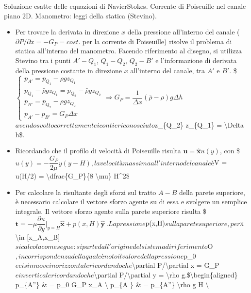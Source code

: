\documentclass[letterpaper,10pt,italian]{jupyterBook}
\begin{document}
\sphinxAtStartPar
Soluzione esatte delle equazioni di Navier\sphinxhyphen{}Stokes. Corrente di
Poiseuille nel canale piano 2D. Manometro: leggi della statica
(Stevino).
\begin{itemize}
\item {} 
\sphinxAtStartPar
Per trovare la derivata in direzione \(x\) della pressione all’interno
del canale (\(\partial P/\partial x = - G_P = cost.\) per la corrente
di Poiseuille) risolve il problema di statica all’interno del
manometro. Facendo riferimento al disegno, si utilizza Stevino tra i
punti \(A'-Q_1\), \(Q_1-Q_2\), \(Q_2-B'\) e l’informazione di derivata
della pressione costante in direzione \(x\) all’interno del canale,
tra \(A'\) e \(B'\). \$\(\begin{cases}
  p_{A'} = p_{Q_1} - \rho g z_{Q_1} \\
  p_{Q_1} - \bar{\rho} g z_{Q_1} =   p_{Q_2} - \bar{\rho} g z_{Q_2} \\
  p_{B'} = p_{Q_2} - \rho g z_{Q_2} \\
  p_{A'} - p_{B'} = G_P \Delta x
 \end{cases} \Rightarrow
  G_P = \dfrac{1}{\Delta x}(\bar{\rho}-\rho) g \Delta h\)\( avendo
svolto correttamente i conti e riconosciuto \)z\_\{Q\_2\} \sphinxhyphen{} z\_\{Q\_1\} =
\textbackslash{}Delta h\$.

\item {} 
\sphinxAtStartPar
Ricordando che il profilo di velocità di Poiseuille risulta
\(\bm{u} = \bm{\hat{x}} u(y)\), con
\$\(u(y) = -\dfrac{G_P}{2 \mu} y (y-H),\)\( la velocità massima
all'interno del canale è \)V = u(H/2) =
\textbackslash{}dfrac\{G\_P\}\{8 \textbackslash{}mu\} H\textasciicircum{}2\$

\item {} 
\sphinxAtStartPar
Per calcolare la risultante degli sforzi sul tratto \(A-B\) della
parete superiore, è necessario calcolare il vettore sforzo agente su
di essa e svolgere un semplice integrale. Il vettore sforzo agente
sulla parete superiore risulta
\$\(\bm{t} = - \mu \dfrac{\partial u}{\partial y}\bigg|_{y=H} \bm{\hat{x}} +
           p(x,H) \bm{\hat{y}} \ .\)\( La pressione \)p(x,H)\( sulla
parete superiore, per \)x \textbackslash{}in {[}x\_A,x\_B{]}\( si calcola come segue: si
parte dall'origine del sistema di riferimento \)O\(, in corrispondenza
della quale è noto il valore della pressione \)p\_0\( e ci si muove in
orizzontale ricordando che \)\textbackslash{}partial P/\textbackslash{}partial x = \sphinxhyphen{}G\_P\( e in
verticale ricordando che \)\textbackslash{}partial P/\textbackslash{}partial y = \sphinxhyphen{}\textbackslash{}rho g\(.
\)\$\textbackslash{}begin\{aligned\}
p\_\{A”\} \& = p\_0 \sphinxhyphen{} G\_P x\_A \textbackslash{}
p\_\{A \} \& = p\_\{A”\} \sphinxhyphen{} \textbackslash{}rho g H  \textbackslash{}


\end{itemize}
\end{document}
